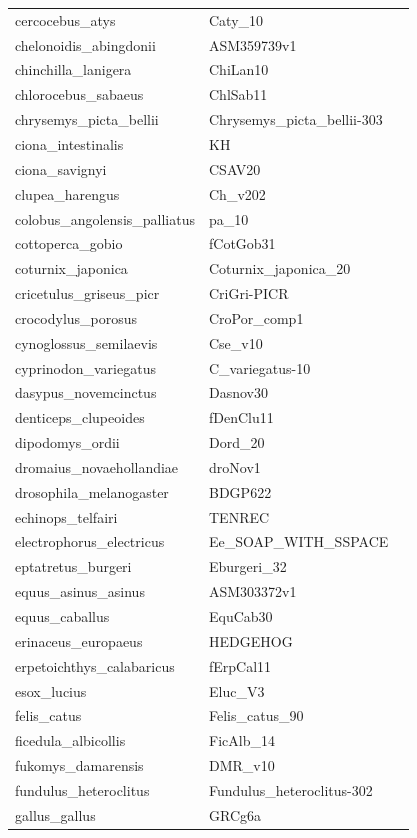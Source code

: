\documentclass{article}
\begin{document}
\begin{table}[!h]
{\begin{tabular}{@{}lll@{}}
cercocebus\_atys&Caty\_10&\\
chelonoidis\_abingdonii&ASM359739v1&\\
chinchilla\_lanigera&ChiLan10&\\
chlorocebus\_sabaeus&ChlSab11&\\
chrysemys\_picta\_bellii&Chrysemys\_picta\_bellii-303&\\
ciona\_intestinalis&KH&\\
ciona\_savignyi&CSAV20&\\
clupea\_harengus&Ch\_v202&\\
colobus\_angolensis\_palliatus&pa\_10&\\
cottoperca\_gobio&fCotGob31&\\
coturnix\_japonica&Coturnix\_japonica\_20&\\
cricetulus\_griseus\_picr&CriGri-PICR&\\
crocodylus\_porosus&CroPor\_comp1&\\
cynoglossus\_semilaevis&Cse\_v10&\\
cyprinodon\_variegatus&C\_variegatus-10&\\
dasypus\_novemcinctus&Dasnov30&\\
denticeps\_clupeoides&fDenClu11&\\
dipodomys\_ordii&Dord\_20&\\
dromaius\_novaehollandiae&droNov1&\\
drosophila\_melanogaster&BDGP622&\\
echinops\_telfairi&TENREC&\\
electrophorus\_electricus&Ee\_SOAP\_WITH\_SSPACE&\\
eptatretus\_burgeri&Eburgeri\_32&\\
equus\_asinus\_asinus&ASM303372v1&\\
equus\_caballus&EquCab30&\\
erinaceus\_europaeus&HEDGEHOG&\\
erpetoichthys\_calabaricus&fErpCal11&\\
esox\_lucius&Eluc\_V3&\\
felis\_catus&Felis\_catus\_90&\\
ficedula\_albicollis&FicAlb\_14&\\
fukomys\_damarensis&DMR\_v10&\\
fundulus\_heteroclitus&Fundulus\_heteroclitus-302&\\
gallus\_gallus&GRCg6a&\\
\hline
\end{tabular}}
\end{table}
\clearpage
\end{document}
